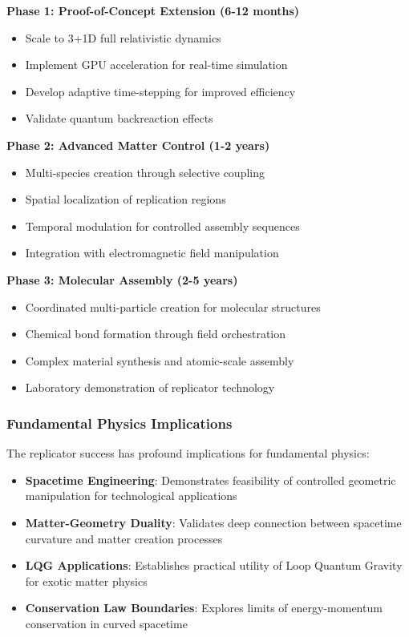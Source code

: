 \documentclass[11pt]{article}
\begin{document}
\textbf{Phase 1: Proof-of-Concept Extension (6-12 months)}
\begin{itemize}
\item Scale to 3+1D full relativistic dynamics
\item Implement GPU acceleration for real-time simulation
\item Develop adaptive time-stepping for improved efficiency
\item Validate quantum backreaction effects
\end{itemize}

\textbf{Phase 2: Advanced Matter Control (1-2 years)}
\begin{itemize}
\item Multi-species creation through selective coupling
\item Spatial localization of replication regions
\item Temporal modulation for controlled assembly sequences
\item Integration with electromagnetic field manipulation
\end{itemize}

\textbf{Phase 3: Molecular Assembly (2-5 years)}
\begin{itemize}
\item Coordinated multi-particle creation for molecular structures
\item Chemical bond formation through field orchestration
\item Complex material synthesis and atomic-scale assembly
\item Laboratory demonstration of replicator technology
\end{itemize}

\subsubsection*{Fundamental Physics Implications}

The replicator success has profound implications for fundamental physics:

\begin{itemize}
\item \textbf{Spacetime Engineering}: Demonstrates feasibility of controlled geometric manipulation for technological applications
\item \textbf{Matter-Geometry Duality}: Validates deep connection between spacetime curvature and matter creation processes
\item \textbf{LQG Applications}: Establishes practical utility of Loop Quantum Gravity for exotic matter physics
\item \textbf{Conservation Law Boundaries}: Explores limits of energy-momentum conservation in curved spacetime
\end{itemize}
\end{document}
